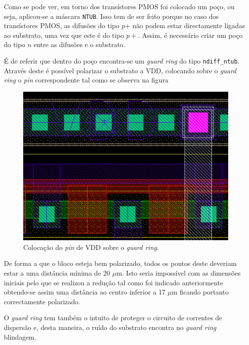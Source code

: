 \documentclass[11pt]{article}
\numberwithin{equation}{section}
\begin{document}
Como se pode ver, em torno dos transístores PMOS foi colocado um poço, ou seja, aplicou-se a máscara \texttt{NTUB}. Isso tem de ser feito porque no caso dos transístores PMOS, as difusões do tipo $p$+ não podem estar directamente ligadas ao substrato, uma vez que este é do tipo $p+$. Assim, é necessário criar um poço do tipo $n$ entre as difusões e o substrato.

É de referir que dentro do poço encontra-se um \textit{guard ring} do tipo \texttt{ndiff\_ntub}. Através deste é possível polarizar o substrato a VDD, colocando sobre o \textit{guard ring} o \textit{pin} correspondente tal como se observa na figura

\begin{figure}[H]
	\centering
	\includegraphics[keepaspectratio=true, scale=0.25]{exps/layout/pinVDD}
	\vspace{-0.5em}
	\caption{Colocação do \textit{pin} de VDD sobre o \textit{guard ring}.}
	\vspace{-0.8em}
\end{figure}

De forma a que o bloco esteja bem polarizado, todos os pontos deste deveriam estar a uma distância mínima de 20 $\mu$m. Isto seria impossível com as dimensões iniciais pelo que se realizou a redução tal como foi indicado anteriormente obtendo-se assim uma distância ao centro inferior a 17 $\mu$m ficando portanto correctamente polarizado.

O \textit{guard ring} tem também o intuito de proteger o circuito de correntes de dispersão e, desta maneira, o ruído do substrato encontra no \textit{guard ring} blindagem.
\end{document}
